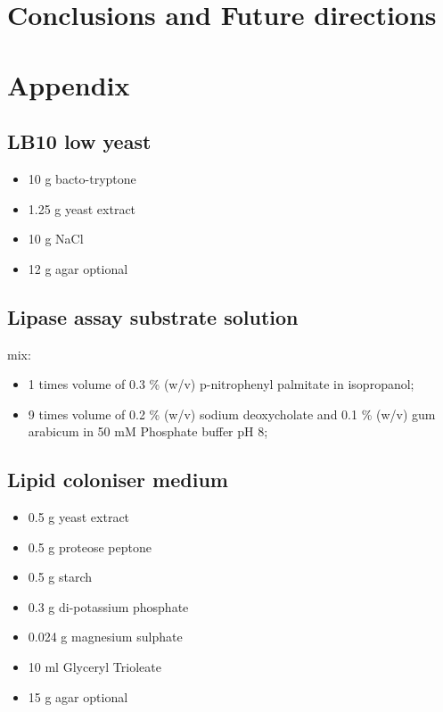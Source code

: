 \documentclass{article}
\begin{document}
%
\newpage
\section{Conclusions and Future directions}

%

\newpage 



\newpage 
\section{Appendix}

\subsection{LB10 low yeast}
\begin{itemize}
\item 10 g bacto-tryptone
\item 1.25 g yeast extract
\item 10 g NaCl
\item 12 g agar optional
\end{itemize}

\subsection{Lipase assay substrate solution}
mix:
\begin{itemize}
\item 1 times volume of 0.3 \% (w/v) p-nitrophenyl palmitate in isopropanol;
\item 9 times volume of 0.2 \% (w/v) sodium deoxycholate and 0.1 \% (w/v) gum arabicum in 50 mM Phosphate buffer pH 8;
\end{itemize}

\subsection{Lipid coloniser medium}
\begin{itemize}
\item 0.5 g yeast extract
\item 0.5 g proteose peptone
\item 0.5 g starch
\item 0.3 g di-potassium phosphate
\item 0.024 g magnesium sulphate
\item 10 ml Glyceryl Trioleate
\item 15 g agar optional
\end{itemize}
\end{document}
